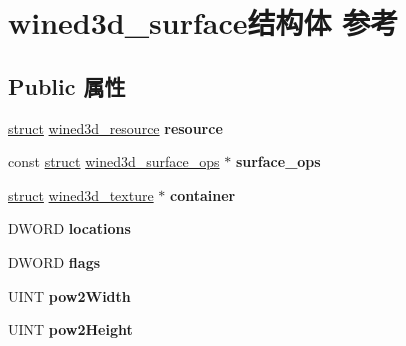\hypertarget{structwined3d__surface}{}\section{wined3d\+\_\+surface结构体 参考}
\label{structwined3d__surface}
\subsection*{Public 属性}
\begin{DoxyCompactItemize}
\item 
\mbox{\label{structwined3d__surface_ac3c9503426c00c7cef9efd94ecf3dc0b}} 
\hyperlink{interfacestruct}{struct} \hyperlink{structwined3d__resource}{wined3d\+\_\+resource} {\bfseries resource}
\item 
\mbox{\label{structwined3d__surface_a9fbe5711c25819a79526ac0a40ea334a}} 
const \hyperlink{interfacestruct}{struct} \hyperlink{structwined3d__surface__ops}{wined3d\+\_\+surface\+\_\+ops} $\ast$ {\bfseries surface\+\_\+ops}
\item 
\mbox{\label{structwined3d__surface_aacecd9bd3bafbcaca07bdb5d11faad91}} 
\hyperlink{interfacestruct}{struct} \hyperlink{structwined3d__texture}{wined3d\+\_\+texture} $\ast$ {\bfseries container}
\item 
\mbox{\label{structwined3d__surface_a09a5c73d4590d150de4158b4f92c9b66}} 
D\+W\+O\+RD {\bfseries locations}
\item 
\mbox{\label{structwined3d__surface_a02d27b6ce752a7f2f2f84be3700666e5}} 
D\+W\+O\+RD {\bfseries flags}
\item 
\mbox{\label{structwined3d__surface_a277bad146956a9b414e3cc8255c4d3d4}} 
U\+I\+NT {\bfseries pow2\+Width}
\item 
\mbox{\label{structwined3d__surface_ad1207a984be60a8d3a7b45546406b38c}} 
U\+I\+NT {\bfseries pow2\+Height}
\item 
\mbox{\label{structwined3d__surface_ac0f044d41afe92fb33334a260a05bbff}} 

\end{DoxyCompactItemize}
